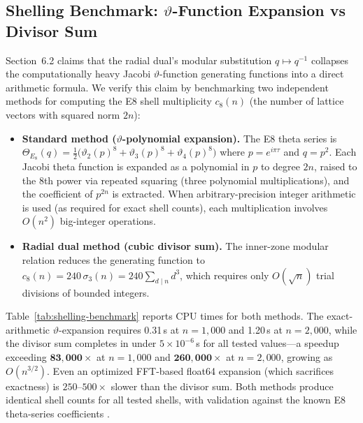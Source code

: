 \documentclass{article}
\begin{document}
\subsection{Shelling Benchmark: $\vartheta$-Function Expansion vs Divisor Sum}
\label{sec:shelling-benchmark}
Section~6.2 claims that the radial dual's modular substitution $q \mapsto q^{-1}$ collapses the computationally heavy Jacobi $\vartheta$-function generating functions into a direct arithmetic formula. We verify this claim by benchmarking two independent methods for computing the E8 shell multiplicity $c_8(n)$ (the number of lattice vectors with squared norm $2n$):

\begin{itemize}
\item \textbf{Standard method ($\vartheta$-polynomial expansion).} The E8 theta series is $\Theta_{E_8}(q) = \tfrac{1}{2}\bigl(\vartheta_2(p)^8 + \vartheta_3(p)^8 + \vartheta_4(p)^8\bigr)$ where $p = e^{i\pi\tau}$ and $q = p^2$. Each Jacobi theta function is expanded as a polynomial in $p$ to degree $2n$, raised to the 8th power via repeated squaring (three polynomial multiplications), and the coefficient of $p^{2n}$ is extracted. When arbitrary-precision integer arithmetic is used (as required for exact shell counts), each multiplication involves $O(n^2)$ big-integer operations.
\item \textbf{Radial dual method (cubic divisor sum).} The inner-zone modular relation reduces the generating function to $c_8(n) = 240\,\sigma_3(n) = 240 \sum_{d \mid n} d^3$, which requires only $O(\sqrt{n})$ trial divisions of bounded integers.
\end{itemize}

Table~\ref{tab:shelling-benchmark} reports CPU times for both methods. The exact-arithmetic $\vartheta$-expansion requires 0.31\,s at $n = 1{,}000$ and 1.20\,s at $n = 2{,}000$, while the divisor sum completes in under $5 \times 10^{-6}$\,s for all tested values---a speedup exceeding $\mathbf{83{,}000\times}$ at $n = 1{,}000$ and $\mathbf{260{,}000\times}$ at $n = 2{,}000$, growing as $O(n^{3/2})$. Even an optimized FFT-based float64 expansion (which sacrifices exactness) is $250$--$500\times$ slower than the divisor sum. Both methods produce identical shell counts for all tested shells, with validation against the known E8 theta-series coefficients \cite{ConwaySloane1999}.
\end{document}
